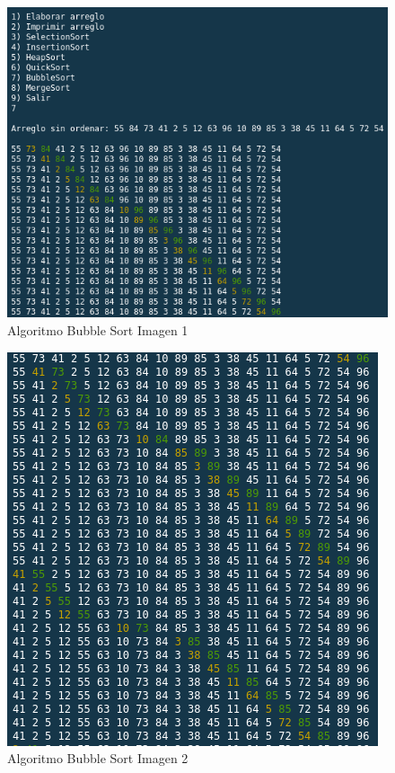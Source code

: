 \documentclass{article}
\begin{document}
		\begin{figure}[H]
			\centering
			\includegraphics[scale = 0.75]{images/e3b1.png}
			\caption{Algoritmo Bubble Sort Imagen 1}
		\end{figure}
	
		\begin{figure}[H]
			\centering
			\includegraphics[scale = 1]{images/e3b2.png}
			\caption{Algoritmo Bubble Sort Imagen 2}
		\end{figure}
	
\end{document}
